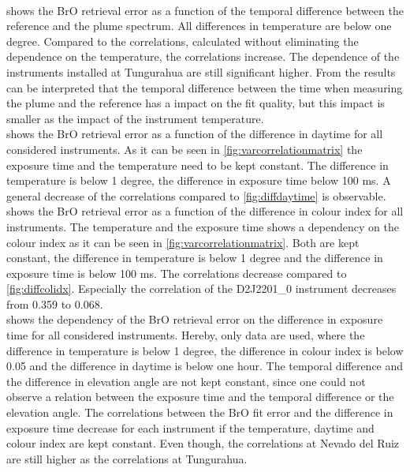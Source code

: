 \documentclass  [
  paper    = a4,
  BCOR     = 10mm,
  twoside,
  fontsize = 12pt,
  fleqn,
  toc      = bibnumbered,
  toc      = listofnumbered,
  numbers  = noendperiod,
  headings = normal,
  listof   = leveldown,
  version  = 3.03
]                                       {scrreprt}
\begin{document}
	\\
	 shows the BrO retrieval error as a function of the temporal difference between the reference and the plume spectrum. All differences in temperature are below one degree. Compared to the correlations, calculated without eliminating the dependence on the temperature, the correlations increase. The dependence of the instruments installed at Tungurahua are still significant higher. From the results can be interpreted that the temporal difference between the time when measuring the plume and the reference has a impact on the fit quality, but this impact is smaller as the impact of the instrument temperature.\\
	 shows the BrO retrieval error as a function of the difference in daytime for all considered instruments. As it can be seen in \cref{fig:varcorrelationmatrix} the exposure time and the temperature need to be kept constant. The difference in temperature is below 1 degree, the difference in exposure time below 100 ms. A general decrease of the correlations compared to \cref{fig:diffdaytime} is observable.\\
	 shows the BrO retrieval error as a function of the difference in colour index for all instruments. The temperature and the exposure time shows a dependency on the colour index as it can be seen in \cref{fig:varcorrelationmatrix}. Both are kept constant, the difference in temperature is below 1 degree and the difference in exposure time is below 100 ms. The correlations decrease compared to \cref{fig:diffcolidx}. Especially the correlation of the D2J2201\_0 instrument decreases from 0.359 to 0.068.\\
	 shows the dependency of the BrO retrieval error on the difference in exposure time for all considered instruments. Hereby, only data are used, where the difference in temperature is below 1 degree, the difference in colour index is below 0.05 and the difference in daytime is below one hour. The temporal difference and the difference in elevation angle are not kept constant, since one could not observe a relation between the exposure time and the temporal difference or the elevation angle. The correlations between the BrO fit error and the difference in exposure time decrease for each instrument if the temperature, daytime and colour index are kept constant. Even though, the correlations at Nevado del Ruiz are still higher as the correlations at Tungurahua.\\
\end{document}
